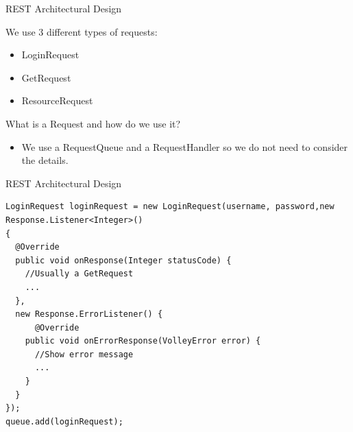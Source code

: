 \begin{frame}{REST Architectural Design}

We use 3 different types of requests:
\begin{itemize}
\item LoginRequest
\item GetRequest
\item ResourceRequest
\end{itemize}

What is a Request and how do we use it?
\begin{itemize}
\item We use a RequestQueue and a RequestHandler so we do not need to consider the details.
\end{itemize}

\end{frame}

\begin{frame}[fragile]{REST Architectural Design}
\begin{center}
\begin{minipage}[H]{0.9\linewidth}
\begin{lstlisting}
LoginRequest loginRequest = new LoginRequest(username, password,new Response.Listener<Integer>() 
{
  @Override
  public void onResponse(Integer statusCode) {
    //Usually a GetRequest
    ...
  }, 
  new Response.ErrorListener() {
	  @Override
    public void onErrorResponse(VolleyError error) {
      //Show error message
      ...
    }
  }
});
queue.add(loginRequest);

\end{lstlisting}
\end{minipage}
\end{center}
\end{frame}

